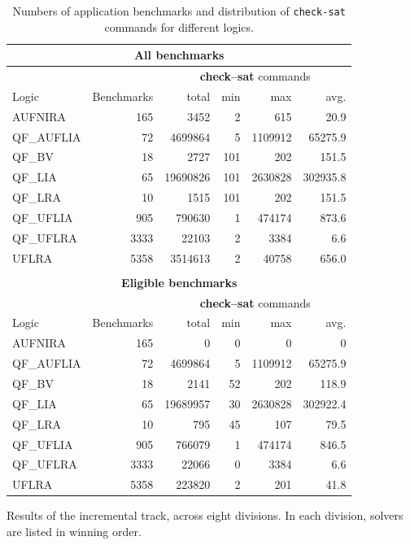 \documentclass[twoside,11pt]{article}
\begin{document}
\begin{table}[ht]
\caption{Numbers of application benchmarks and distribution of \lstinline{check-sat} commands for different logics.}
\label{Fig:apptrack-benchmarks}
\centering
\begin{tabular}{|l|r|rrrr|}
\multicolumn{6}{c}{\textbf{All benchmarks}} \\
\hline
&  & \multicolumn{4}{c|}{{\small\bfseries\sffamily check--sat} commands} \\
 Logic & Benchmarks & total & min & max & avg. \\
\hline
AUFNIRA & 165  & 3452 & 2 & 615 & 20.9 \\
QF\_AUFLIA & 72 & 4699864 & 5 & 1109912 & 65275.9 \\
QF\_BV & 18 & 2727 & 101 & 202 & 151.5 \\
QF\_LIA & 65 & 19690826 & 101 & 2630828 & 302935.8 \\
QF\_LRA & 10 & 1515 & 101 & 202 & 151.5 \\
QF\_UFLIA & 905 & 790630 & 1 & 474174 & 873.6 \\
QF\_UFLRA & 3333 & 22103 & 2 & 3384 & 6.6 \\
UFLRA & 5358 & 3514613 & 2 & 40758 & 656.0 \\
\hline
\multicolumn{6}{c}{}\\
\multicolumn{6}{c}{\textbf{Eligible benchmarks}} \\
\hline
&  & \multicolumn{4}{c|}{{\small\bfseries\sffamily check--sat} commands} \\
 Logic & Benchmarks & total & min & max & avg. \\
\hline
AUFNIRA & 165  & 0 & 0 & 0 & 0 \\
QF\_AUFLIA & 72 & 4699864 & 5 & 1109912 & 65275.9 \\
QF\_BV & 18 & 2141 & 52 & 202 & 118.9 \\
QF\_LIA & 65 & 19689957 & 30 & 2630828 & 302922.4 \\
QF\_LRA & 10 & 795 & 45 & 107 & 79.5 \\
QF\_UFLIA & 905 & 766079 & 1 & 474174 & 846.5 \\
QF\_UFLRA & 3333 & 22066 & 0 & 3384 & 6.6 \\
UFLRA & 5358 & 223820 & 2 & 201 & 41.8 \\
\hline
\end{tabular}
\end{table}

\begin{table}
\caption{Results of the incremental track, across eight divisions. In each division, solvers are listed in winning order.}
\label{Fig:apptrack-results}
\vspace{-\medskipamount}
\centering
\resizebox{!}{294pt}{}
\end{table}
\end{document}

